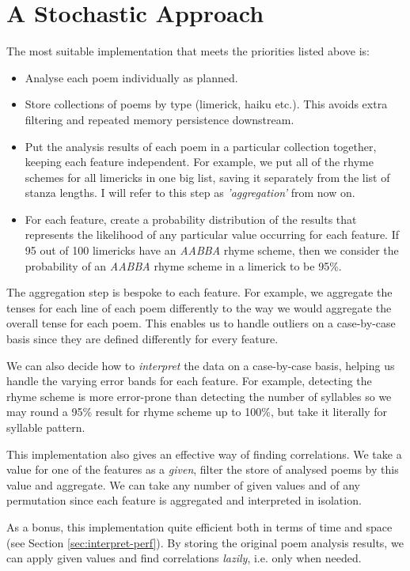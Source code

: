 \section{A Stochastic Approach}
\label{sec:approach}

The most suitable implementation that meets the priorities listed above is:
\begin{itemize}
\item{Analyse each poem individually as planned.}
\item{Store collections of poems by type (limerick, haiku etc.). This avoids extra filtering and repeated memory persistence downstream.}
\item{Put the analysis results of each poem in a particular collection together, keeping each feature independent. For example, we put all of the rhyme schemes for all limericks in one big list, saving it separately from the list of stanza lengths. I will refer to this step as \textit{'aggregation'} from now on.}
\item{For each feature, create a probability distribution of the results that represents the likelihood of any particular value occurring for each feature. If 95 out of 100 limericks have an \textit{AABBA} rhyme scheme, then we consider the probability of an \textit{AABBA} rhyme scheme in a limerick to be 95\%.}
\end{itemize}

The aggregation step is bespoke to each feature. For example, we aggregate the tenses for each line of each poem differently to the way we would aggregate the overall tense for each poem. This enables us to handle outliers on a case-by-case basis since they are defined differently for every feature.

We can also decide how to \textit{interpret} the data on a case-by-case basis, helping us handle the varying error bands for each feature. For example, detecting the rhyme scheme is more error-prone than detecting the number of syllables so we may round a 95\% result for rhyme scheme up to 100\%, but take it literally for syllable pattern.

This implementation also gives an effective way of finding correlations. We take a value for one of the features as a \textit{given}, filter the store of analysed poems by this value and aggregate. We can take any number of given values and of any permutation since each feature is aggregated and interpreted in isolation.

As a bonus, this implementation quite efficient both in terms of time and space (see Section \ref{sec:interpret-perf}). By storing the original poem analysis results, we can apply given values and find correlations \textit{lazily}, i.e. only when needed.



